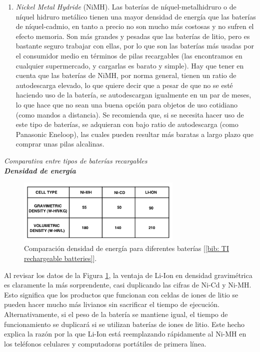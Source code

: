 \documentclass[12pt]{article}
\begin{document}
\begin{enumerate}
		\item \textit{Nickel Metal Hydride} (NiMH). Las baterías de níquel-metalhidruro o de níquel hidruro metálico tienen una mayor densidad de energía que las baterías de níquel-cadmio, en tanto a precio no son mucho más costosas y no sufren el efecto memoria. Son más grandes y pesadas que las baterías de litio, pero es bastante seguro trabajar con ellas, por lo que son las baterías más usadas por el consumidor medio en términos de pilas recargables (las encontramos en cualquier supermercado, y cargarlas es barato y simple). Hay que tener en cuenta que las baterías de NiMH, por norma general, tienen un ratio de autodescarga elevado, lo que quiere decir que a pesar de que no se esté haciendo uso de la batería, se autodescargan igualmente en un par de meses, lo que hace que no sean una buena opción para objetos de uso cotidiano (como mandos a distancia). Se recomienda que, si se necesita hacer uso de este tipo de baterías, se adquieran con bajo ratio de autodescarga (como Panasonic Eneloop), las cuales pueden resultar más baratas a largo plazo que comprar unas pilas alcalinas.
		
	\end{enumerate}
	
	\noindent \textit{Comparativa entre tipos de baterías recargables} \\
	
	\noindent \textit{\textbf{Densidad de energía}}
	
		\begin{figure}[h]
		\begin{center}
			\includegraphics[width=0.7\textwidth]{img/energyDensityComparison_TxInst.png}
			\caption{Comparación densidad de energía para diferentes baterías [\ref{bib: TI rechargeable batteries}].}
			\label{fig: comparación densidad energía}
		\end{center}
	\end{figure}
	
	 
	
	\noindent Al revisar los datos de la Figura \ref{fig: comparación densidad energía}, la ventaja de Li-Ion en densidad gravimétrica es claramente la más sorprendente, casi duplicando las cifras de Ni-Cd y Ni-MH. Esto significa que los productos que funcionan con celdas de iones de litio se pueden hacer mucho más livianos sin sacrificar el tiempo de ejecución. Alternativamente, si el peso de la batería se mantiene igual, el tiempo de funcionamiento se duplicará si se utilizan baterías de iones de litio. Este hecho explica la razón por la que Li-Ion está reemplazando rápidamente al Ni-MH en los teléfonos celulares y computadoras portátiles de primera línea. \\
	
\end{document}
